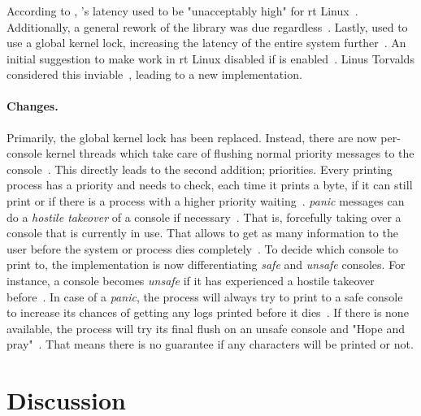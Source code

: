 \documentclass[10pt,twocolumn,a4paper]{article}
\begin{document}
\subsubsection{}\label{subsubsec:printk}
According to \citeauthor{edge_discussion_2022}, 's latency used to be "unacceptably high" for \acrshort{rt} Linux~\cite{edge_discussion_2022}.
Additionally, a general rework of the library was due regardless~\cite{edge_discussion_2022}.
Lastly,  used to use a global kernel lock, increasing the latency of the entire system further~\cite{gleixner_printk_2024}.
An initial suggestion to make  work in \acrshort{rt} Linux disabled  if  is enabled~\cite{mladek_printk_2022}.
Linus Torvalds considered this inviable~\cite{torvalds_initial_2022}, leading to a new implementation.

\paragraph{Changes.}
Primarily, the global kernel lock has been replaced.
Instead, there are now per-console kernel threads which take care of flushing normal priority messages to the console~\cite{gleixner_printk_2024}.
This directly leads to the second addition; priorities.
Every printing process has a priority and needs to check, each time it prints a byte, if it can still print or if there is a process with a higher priority waiting~\cite{edge_discussion_2022}.
\emph{panic} messages can do a \emph{hostile takeover} of a console if necessary~\cite{edge_discussion_2022}.
That is, forcefully taking over a console that is currently in use.
That allows to get as many information to the user before the system or process dies completely~\cite{edge_discussion_2022}.
To decide which console to print to, the  implementation is now differentiating \emph{safe} and \emph{unsafe} consoles.
For instance, a console becomes \emph{unsafe} if it has experienced a hostile takeover before~\cite{kernel_development_community_console}.
In case of a \emph{panic}, the process will always try to print to a safe console to increase its chances of getting any logs printed before it dies~\cite{gleixner_printk_2024}.
If there is none available, the process will try its final flush on an unsafe console and "Hope and pray"~\cite{kernel_development_community_console}.
That means there is no guarantee if any characters will be printed or not.

\section{Discussion}\label{sec:discussion}
\end{document}
